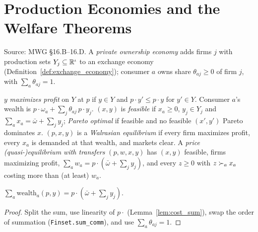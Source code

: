 \chapter{Production Economies and the Welfare Theorems}
\label{chap:ge_production}

Source: MWG \S16.B--16.D. A \emph{private ownership economy} adds firms $j$ with production sets
$Y_j \subseteq \mathbb{R}^\iota$ to an exchange economy (Definition~\ref{def:exchange_economy}); consumer $a$ owns share
$\theta_{aj} \ge 0$ of firm $j$, with $\sum_a \theta_{aj} = 1$.

\begin{definition}
\label{def:production_economy}
\leanok
{}
$y$ \emph{maximizes profit} on $Y$ at $p$ if $y \in Y$ and $p \cdot y' \le p \cdot y$ for $y' \in Y$. Consumer $a$'s
wealth is $p \cdot \omega_a + \sum_j \theta_{aj}\, p \cdot y_j$. $(x, y)$ is \emph{feasible} if $x_a \ge 0$,
$y_j \in Y_j$ and $\sum_a x_a = \bar\omega + \sum_j y_j$; \emph{Pareto optimal} if feasible and no feasible $(x', y')$
Pareto dominates $x$. $(p, x, y)$ is a \emph{Walrasian equilibrium} if every firm maximizes profit, every $x_a$ is
demanded at that wealth, and markets clear. A \emph{price (quasi-)equilibrium with transfers} $(p, w, x, y)$ has
$(x,y)$ feasible, firms maximizing profit, $\sum_a w_a = p \cdot (\bar\omega + \sum_j y_j)$, and every $z \ge 0$
with $z \succ_a x_a$ costing more than (at least) $w_a$.
\end{definition}

\begin{lemma}
\label{lem:sum_wealth}
\leanok
{}
$\sum_a \mathrm{wealth}_a(p, y) = p \cdot (\bar\omega + \sum_j y_j)$.
\end{lemma}
\begin{proof}
\leanok
Split the sum, use linearity of $p \cdot$ (Lemma~\ref{lem:cost_sum}), swap the order of summation
(\texttt{Finset.sum\_comm}), and use $\sum_a \theta_{aj} = 1$.
\end{proof}

